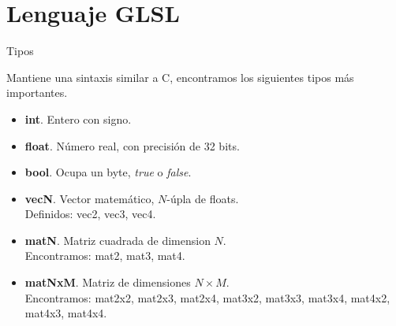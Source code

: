 \section{Lenguaje GLSL}

\SectionPage

\begin{frame}{Tipos}
    
    Mantiene una sintaxis similar a C, encontramos los siguientes tipos más importantes.
    \vfill
    
    \begin{itemize}
        \item \textbf{int}. Entero con signo.
        \item \textbf{float}. Número real, con precisión de 32 bits.
        \item \textbf{bool}. Ocupa un byte, \textit{true} o \textit{false}.
        \item \textbf{vecN}. Vector matemático, \(N\)-úpla de floats.\\Definidos: vec2, vec3, vec4.
        \item \textbf{matN}. Matriz cuadrada de dimension \(N\).\\Encontramos: mat2, mat3, mat4.
        \item \textbf{matNxM}. Matriz de dimensiones \(N\times M\).\\Encontramos: mat2x2, mat2x3, mat2x4, mat3x2, mat3x3, mat3x4, mat4x2, mat4x3, mat4x4.
    \end{itemize}
    
\end{frame}

